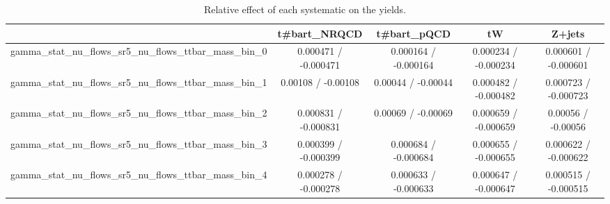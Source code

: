 \documentclass[10pt]{article}
\begin{document}
\begin{table}[htbp]
\begin{center}
\begin{tabular}{|c|c|c|c|c|}
\hline 
      & t#bar{t}_{NRQCD}      & t#bar{t}_{pQCD}      & tW      & Z+jets \\ 
\hline 
  gamma_stat_nu_flows_sr5_nu_flows_ttbar_mass_bin_0 & 0.000471 / -0.000471 & 0.000164 / -0.000164 & 0.000234 / -0.000234 & 0.000601 / -0.000601 \\ 
  gamma_stat_nu_flows_sr5_nu_flows_ttbar_mass_bin_1 & 0.00108 / -0.00108 & 0.00044 / -0.00044 & 0.000482 / -0.000482 & 0.000723 / -0.000723 \\ 
  gamma_stat_nu_flows_sr5_nu_flows_ttbar_mass_bin_2 & 0.000831 / -0.000831 & 0.00069 / -0.00069 & 0.000659 / -0.000659 & 0.00056 / -0.00056 \\ 
  gamma_stat_nu_flows_sr5_nu_flows_ttbar_mass_bin_3 & 0.000399 / -0.000399 & 0.000684 / -0.000684 & 0.000655 / -0.000655 & 0.000622 / -0.000622 \\ 
  gamma_stat_nu_flows_sr5_nu_flows_ttbar_mass_bin_4 & 0.000278 / -0.000278 & 0.000633 / -0.000633 & 0.000647 / -0.000647 & 0.000515 / -0.000515 \\ 
\hline 
\end{tabular} 
\caption{Relative effect of each systematic on the yields.} 
\end{center} 
\end{table} 
\end{document}
